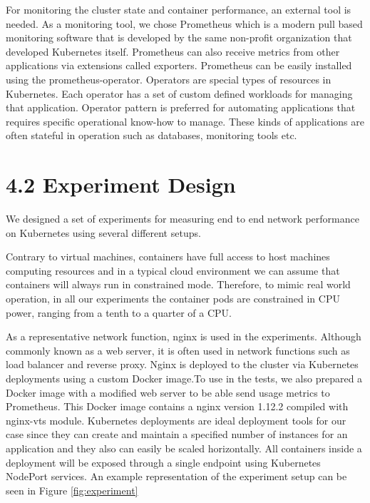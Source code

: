 \documentclass[12pt,oneandhalf,chaparabic,ceng,ms,eng,oneside,pntc]{gsufbe}
\begin{document}
For monitoring the cluster state and container performance, an external tool is needed.  As a monitoring
tool, we chose Prometheus which is a modern pull based monitoring software that is developed by the same
non-profit 
organization that developed Kubernetes itself. Prometheus can also receive metrics from other applications
via extensions called exporters. Prometheus can be easily installed using the prometheus-operator.
Operators are special types of resources in Kubernetes.  Each operator has a set of custom defined
workloads for managing that application. Operator pattern is preferred for automating applications that
requires specific operational know-how to manage.  These kinds of applications are often stateful in
operation such as databases, monitoring tools etc.

\section[Experiment Design]{4.2 Experiment Design}
We designed a set of experiments for measuring end to end network performance on Kubernetes using several
different setups.

Contrary to virtual machines, containers have full
access to host machines computing resources and in a typical cloud environment we can assume that
containers will always run in constrained mode.  Therefore, to mimic real world operation, in all our
experiments  the container pods are constrained in CPU power, ranging from a tenth to a quarter of a CPU.

As a representative  network function, nginx is used in the experiments. Although commonly known as a
web server, it is often used in network
functions such as load balancer and reverse proxy.  Nginx is deployed to the cluster via Kubernetes
deployments using a custom Docker image.To use in the tests, we also  prepared a Docker image with a
modified web server to be able send usage metrics to Prometheus.  This Docker image contains a nginx
version 1.12.2 compiled with nginx-vts module. Kubernetes deployments are ideal deployment tools for
our case since they can create and maintain a specified number of instances for an application and
they also can easily be scaled horizontally.  All containers inside a deployment will be exposed 
through a single endpoint using Kubernetes NodePort services. An example representation of the experiment
setup can be seen in Figure \ref{fig:experiment}
\end{document}
